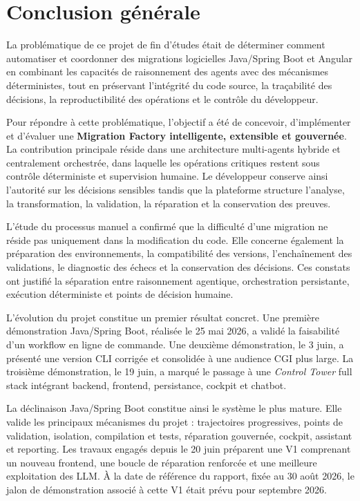 \chapter*{Conclusion générale}

La problématique de ce projet de fin d'études était de déterminer comment automatiser et coordonner des migrations logicielles Java/Spring Boot et Angular en combinant les capacités de raisonnement des agents avec des mécanismes déterministes, tout en préservant l'intégrité du code source, la traçabilité des décisions, la reproductibilité des opérations et le contrôle du développeur.

Pour répondre à cette problématique, l'objectif a été de concevoir, d'implémenter et d'évaluer une \textbf{Migration Factory intelligente, extensible et gouvernée}. La contribution principale réside dans une architecture multi-agents hybride et centralement orchestrée, dans laquelle les opérations critiques restent sous contrôle déterministe et supervision humaine. Le développeur conserve ainsi l'autorité sur les décisions sensibles tandis que la plateforme structure l'analyse, la transformation, la validation, la réparation et la conservation des preuves.

L'étude du processus manuel a confirmé que la difficulté d'une migration ne réside pas uniquement dans la modification du code. Elle concerne également la préparation des environnements, la compatibilité des versions, l'enchaînement des validations, le diagnostic des échecs et la conservation des décisions. Ces constats ont justifié la séparation entre raisonnement agentique, orchestration persistante, exécution déterministe et points de décision humaine.

L'évolution du projet constitue un premier résultat concret. Une première démonstration Java/Spring Boot, réalisée le 25 mai 2026, a validé la faisabilité d'un workflow en ligne de commande. Une deuxième démonstration, le 3 juin, a présenté une version CLI corrigée et consolidée à une audience CGI plus large. La troisième démonstration, le 19 juin, a marqué le passage à une \textit{Control Tower} full stack intégrant backend, frontend, persistance, cockpit et chatbot.

La déclinaison Java/Spring Boot constitue ainsi le système le plus mature. Elle valide les principaux mécanismes du projet : trajectoires progressives, points de validation, isolation, compilation et tests, réparation gouvernée, cockpit, assistant et reporting. Les travaux engagés depuis le 20 juin préparent une V1 comprenant un nouveau frontend, une boucle de réparation renforcée et une meilleure exploitation des LLM. À la date de référence du rapport, fixée au 30 août 2026, le jalon de démonstration associé à cette V1 était prévu pour septembre 2026.

